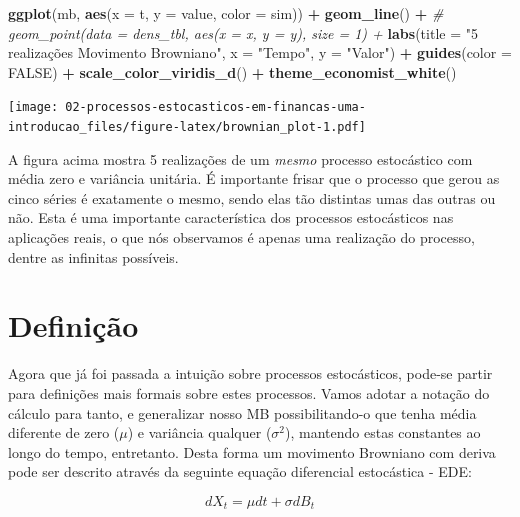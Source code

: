 \documentclass[]{book}
\newenvironment{Shaded}{\begin{snugshade}}{\end{snugshade}}
\newcommand{\CommentTok}[1]{\textcolor[rgb]{0.56,0.35,0.01}{\textit{#1}}}
\newcommand{\DataTypeTok}[1]{\textcolor[rgb]{0.13,0.29,0.53}{#1}}
\newcommand{\KeywordTok}[1]{\textcolor[rgb]{0.13,0.29,0.53}{\textbf{#1}}}
\newcommand{\NormalTok}[1]{#1}
\newcommand{\OperatorTok}[1]{\textcolor[rgb]{0.81,0.36,0.00}{\textbf{#1}}}
\newcommand{\OtherTok}[1]{\textcolor[rgb]{0.56,0.35,0.01}{#1}}
\newcommand{\StringTok}[1]{\textcolor[rgb]{0.31,0.60,0.02}{#1}}
\theoremstyle{definition}
\theoremstyle{definition}
\theoremstyle{definition}
\theoremstyle{remark}
\begin{document}
\begin{Shaded}
\begin{Highlighting}[]
\KeywordTok{ggplot}\NormalTok{(mb, }\KeywordTok{aes}\NormalTok{(}\DataTypeTok{x =}\NormalTok{ t, }\DataTypeTok{y =}\NormalTok{ value, }\DataTypeTok{color =}\NormalTok{ sim)) }\OperatorTok{+}\StringTok{ }
\StringTok{  }\KeywordTok{geom_line}\NormalTok{() }\OperatorTok{+}
\CommentTok{#  geom_point(data = dens_tbl, aes(x = x, y = y), size = 1) +}
\StringTok{  }\KeywordTok{labs}\NormalTok{(}\DataTypeTok{title =} \StringTok{"5 realizações Movimento Browniano"}\NormalTok{,}
       \DataTypeTok{x =} \StringTok{"Tempo"}\NormalTok{,}
       \DataTypeTok{y =} \StringTok{"Valor"}\NormalTok{) }\OperatorTok{+}
\StringTok{  }\KeywordTok{guides}\NormalTok{(}\DataTypeTok{color =} \OtherTok{FALSE}\NormalTok{) }\OperatorTok{+}
\StringTok{  }\KeywordTok{scale_color_viridis_d}\NormalTok{() }\OperatorTok{+}
\StringTok{  }\KeywordTok{theme_economist_white}\NormalTok{()}
\end{Highlighting}
\end{Shaded}

\texttt{[image: 02-processos-estocasticos-em-financas-uma-introducao\_files/figure-latex/brownian\_plot-1.pdf]}

A figura acima mostra 5 realizações de um \emph{mesmo} processo estocástico com média zero e variância unitária. É importante frisar que o processo que gerou as cinco séries é exatamente o mesmo, sendo elas tão distintas umas das outras ou não. Esta é uma importante característica dos processos estocásticos nas aplicações reais, o que nós observamos é apenas uma realização do processo, dentre as infinitas possíveis.

\hypertarget{definicao}{%
\section{Definição}\label{definicao}}

Agora que já foi passada a intuição sobre processos estocásticos, pode-se partir para definições mais formais sobre estes processos. Vamos adotar a notação do cálculo para tanto, e generalizar nosso MB possibilitando-o que tenha média diferente de zero (\(\mu\)) e variância qualquer (\(\sigma^2\)), mantendo estas constantes ao longo do tempo, entretanto. Desta forma um movimento Browniano com deriva pode ser descrito através da seguinte equação diferencial estocástica - EDE:

\begin{equation}
dX_t = \mu dt + \sigma dB_t
\label{eq:mb}
\end{equation}
\end{document}
